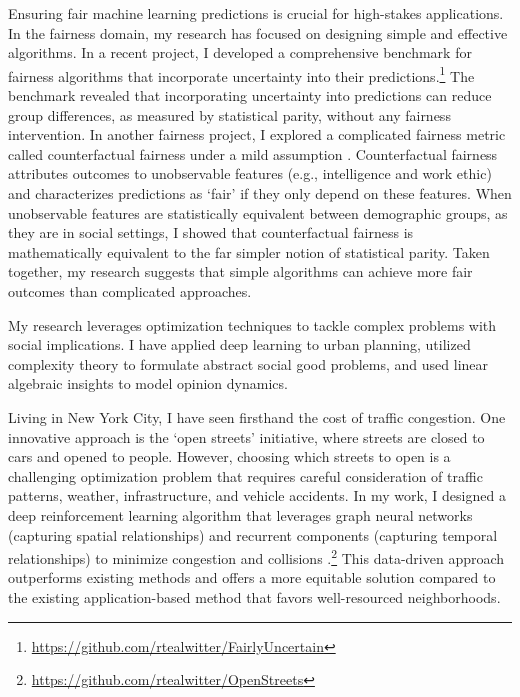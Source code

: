 \documentclass[11pt]{article}
\begin{document}
Ensuring fair machine learning predictions is crucial for high-stakes applications. In the fairness domain, my research has focused on designing simple and effective algorithms. In a recent project, I developed a comprehensive benchmark for fairness algorithms that incorporate uncertainty into their predictions.\footnote{\url{https://github.com/rtealwitter/FairlyUncertain}} The benchmark revealed that incorporating uncertainty into predictions can reduce group differences, as measured by statistical parity, without any fairness intervention. In another fairness project, I explored a complicated fairness metric called counterfactual fairness under a mild assumption \cite{rosenblatt2023counterfactual}. Counterfactual fairness attributes outcomes to unobservable features (e.g., intelligence and work ethic) and characterizes predictions as `fair' if they only depend on these features. When unobservable features are statistically equivalent between demographic groups, as they are in social settings, I showed that counterfactual fairness is mathematically equivalent to the far simpler notion of statistical parity. Taken together, my research suggests that simple algorithms can achieve more fair outcomes than complicated approaches.


My research leverages optimization techniques to tackle complex problems with social implications. I have applied deep learning to urban planning, utilized complexity theory to formulate abstract social good problems, and used linear algebraic insights to model opinion dynamics.

Living in New York City, I have seen firsthand the cost of traffic congestion. One innovative approach is the `open streets' initiative, where streets are closed to cars and opened to people. However, choosing which streets to open is a challenging optimization problem that requires careful consideration of traffic patterns, weather, infrastructure, and vehicle accidents. In my work, I designed a deep reinforcement learning algorithm that leverages graph neural networks (capturing spatial relationships) and recurrent components (capturing temporal relationships) to minimize congestion and collisions \cite{witter2024i}.\footnote{\url{https://github.com/rtealwitter/OpenStreets}} This data-driven approach outperforms existing methods and offers a more equitable solution compared to the existing application-based method that favors well-resourced neighborhoods.
\end{document}
